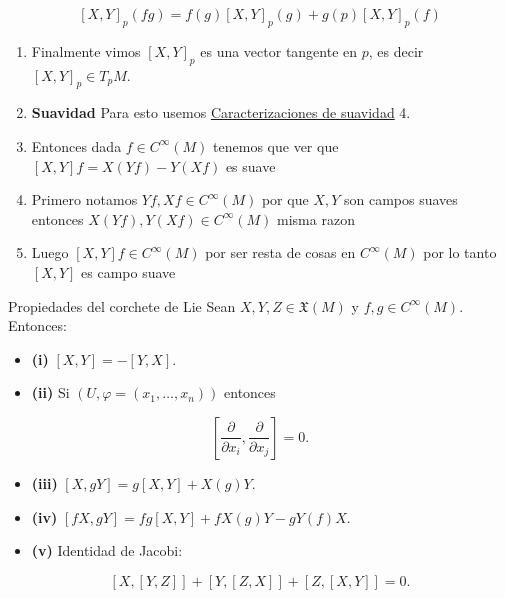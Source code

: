 \begin{bookproof}{}
\[
[X,Y]_{p}(fg)=f(g)[X,Y]_{p}(g)+g(p)[X,Y]_{p}(f)
\]
\begin{enumerate}[start=11]
\item Finalmente vimos $[X,Y]_p$ es una vector tangente en $p$, es decir $[X,Y]_p\in T_pM$.
\item \textbf{Suavidad} Para esto usemos \hyperref[blk:3accf8]{Caracterizaciones de suavidad} 4.
\item Entonces dada $f\in C^{\infty}(M)$ tenemos que ver que $[X,Y]f=X(Yf)-Y(Xf)$ es suave
\item Primero notamos $Yf,Xf\in C^{\infty}(M)$ por que $X,Y$ son campos suaves entonces $X(Yf),Y(Xf)\in C^{\infty}(M)$ misma razon
\item Luego $[X,Y]f\in C^{\infty}(M)$ por ser resta de cosas en $C^{\infty}(M)$ por lo tanto $[X,Y]$ es campo suave
\end{enumerate}
\bookqed
\end{bookproof}
\begin{bookproposition}{Propiedades del corchete de Lie}
Sean $X,Y,Z\in\mathfrak X(M)$ y $f,g\in C^\infty(M)$. Entonces:

\begin{itemize}
\item \textbf{(i)} $[X,Y]=-[Y,X]$.
\item \textbf{(ii)} Si $(U,\varphi=(x_{1},\ldots,x_{n}))$ entonces
\end{itemize}
\[
\left[\frac{\partial}{\partial x_i},\frac{\partial}{\partial x_j}\right]=0.
\]
\begin{itemize}
\item \textbf{(iii)} $[X,gY]=g[X,Y]+X(g)Y$.
\item \textbf{(iv)} $[fX,gY]=fg[X,Y]+fX(g)Y-gY(f)X$.
\item \textbf{(v)} Identidad de Jacobi:
\end{itemize}
\[
[X,[Y,Z]]+[Y,[Z,X]]+[Z,[X,Y]]=0.
\]
\end{bookproposition}
